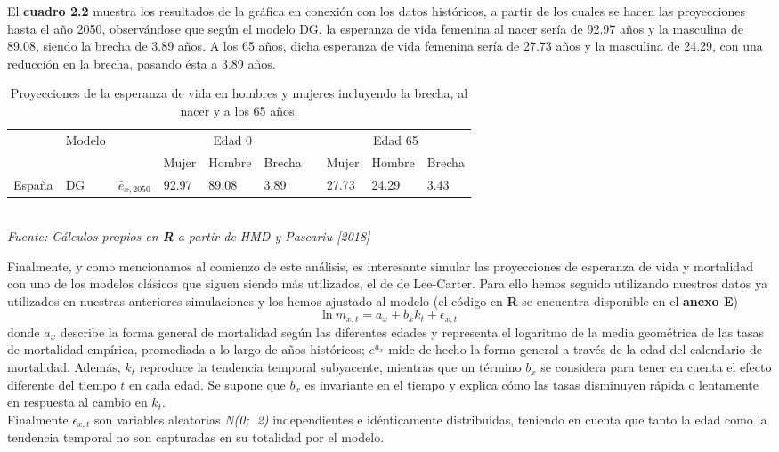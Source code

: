 El \textbf{cuadro 2.2} muestra los resultados de la gráfica en conexión con los datos históricos, a partir de los cuales se hacen las proyecciones hasta el año 2050, observándose que según el modelo DG, la esperanza de vida femenina al nacer sería de 92.97 años y la masculina de 89.08, siendo la brecha de 3.89 años. A los 65 años, dicha esperanza de vida femenina sería de 27.73 años y la masculina de 24.29, con una reducción en la brecha, pasando ésta a 3.89 años.

\begin{table}[htp]
\begin{center}
\begin{tabular}{llllllllll}\hline
       & \multirow{2}{*}{Modelo} &              & \multicolumn{3}{c}{Edad 0}   &  & \multicolumn{3}{c}{Edad 65}        \\ \cline{4-6} \cline{8-10} 
       &        &              & \cellcolor[gray]{0.85}Mujer  & \cellcolor[gray]{0.85}Hombre & \cellcolor[gray]{0.85}Brecha &  & \cellcolor[gray]{0.85}Mujer   & \cellcolor[gray]{0.85}Hombre & \cellcolor[gray]{0.85}Brecha \\ \hline
España & DG     & $\hat{e}_{x,2050}$ & 92.97  & 89.08  & 3.89   &  & 27.73   & 24.29  & 3.43\\  \hline
\end{tabular}
\captionsetup{width=1\linewidth}
\caption[Proyecciones estimadas de la esperanza de vida año 2050 entre hombres y mujeres ]{Proyecciones de la esperanza de vida en hombres y mujeres incluyendo la brecha, al nacer y a los 65 años.}\\
\textit{Fuente: Cálculos propios en \textbf{R} a partir de HMD y Pascariu [2018]}
\end{center}
\end{table}

Finalmente, y como mencionamos al comienzo de este análisis, es interesante simular las proyecciones de esperanza de vida y mortalidad con uno de los modelos clásicos que siguen siendo más utilizados, el de de Lee-Carter. Para ello hemos seguido utilizando nuestros datos ya utilizados en nuestras anteriores simulaciones y los hemos ajustado al modelo (el código en \textsf{\textbf{R}} se encuentra disponible en el \textbf{anexo E}) $$\text{ln}\ m_{x,t}=a_{x}+b_{x}k_{t}+\epsilon_{x,t}$$ donde $a_{x}$ describe la forma general de mortalidad según las diferentes edades y representa el logaritmo de la media geométrica de las tasas de mortalidad empírica, promediada a lo largo de años históricos; $e^{a_{x}}$ mide de hecho la forma general a través de la edad del calendario de mortalidad. Además, $k_{t}$ reproduce la tendencia temporal subyacente, mientras que un término $b_{x}$ se considera para tener en cuenta el efecto diferente del tiempo $t$ en cada edad. Se supone que $b_{x}$ es invariante en el tiempo y explica cómo las tasas disminuyen rápida o lentamente en respuesta al cambio en $k_{t}$.\\
Finalmente $\epsilon_{x,t}$ son variables aleatorias \textit{N(0; 2)} independientes e idénticamente distribuidas, teniendo en cuenta que tanto la edad como la tendencia temporal no son capturadas en su totalidad por el modelo.\\

